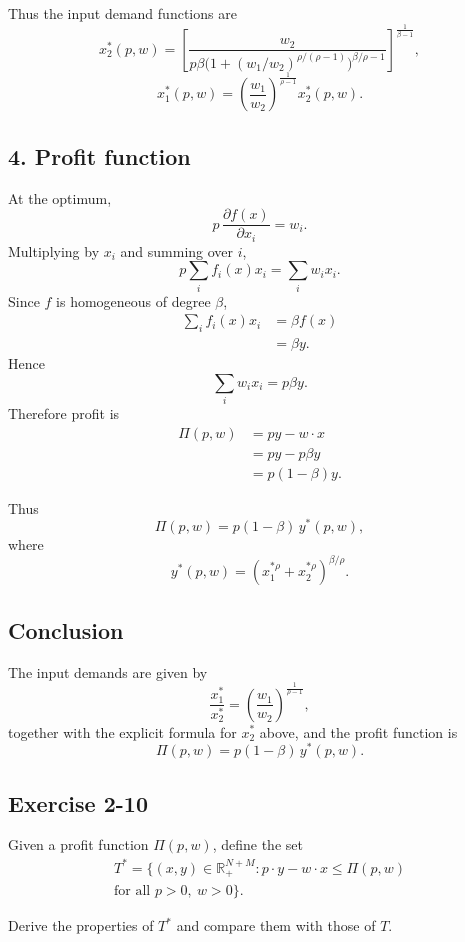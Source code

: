 Thus the input demand functions are
\[
\boxed{
x_2^*(p,w)
=
\left[
\frac{w_2}{p\beta \bigl(1+(w_1/w_2)^{\rho/(\rho-1)}\bigr)^{\beta/\rho-1}}
\right]^{\frac{1}{\beta-1}},
}
\]
\[
\boxed{
x_1^*(p,w)
=
\left(\frac{w_1}{w_2}\right)^{\frac{1}{\rho-1}} x_2^*(p,w).
}
\]

\subsection*{4. Profit function}

At the optimum,
\[
p\,\frac{\partial f(x)}{\partial x_i}=w_i.
\]
Multiplying by \(x_i\) and summing over \(i\),
\[
p\sum_i f_i(x)x_i=\sum_i w_ix_i.
\]
Since \(f\) is homogeneous of degree \(\beta\),
\[
\begin{aligned}
\sum_i f_i(x)x_i
&=\beta f(x)\\
&=\beta y.
\end{aligned}
\]
Hence
\[
\sum_i w_ix_i=p\beta y.
\]
Therefore profit is
\[
\begin{aligned}
\Pi(p,w)
&=py-w\cdot x\\
&=p y-p\beta y\\
&=p(1-\beta)y.
\end{aligned}
\]

Thus
\[
\boxed{
\Pi(p,w)=p(1-\beta)\,y^*(p,w),
}
\]
where
\[
y^*(p,w)=\left(x_1^{*\rho}+x_2^{*\rho}\right)^{\beta/\rho}.
\]

\subsection*{Conclusion}

The input demands are given by
\[
\boxed{
\frac{x_1^*}{x_2^*}
=
\left(\frac{w_1}{w_2}\right)^{\frac{1}{\rho-1}},
}
\]
together with the explicit formula for \(x_2^*\) above, and the profit function is
\[
\boxed{
\Pi(p,w)=p(1-\beta)\,y^*(p,w).
}
\]



\vspace{30pt}
\begin{tcolorbox}[breakable]

\subsection*{Exercise 2-10}

Given a profit function $\Pi(p,w)$, define the set
\[
\begin{aligned}
T^*
=
\{(x,y)\in \mathbb{R}_+^{N+M} : p\cdot y - w\cdot x \le \Pi(p,w)\\
\text{for all } p>0,\ w>0\}.
\end{aligned}
\]

Derive the properties of $T^*$ and compare them with those of $T$.

\end{tcolorbox}

